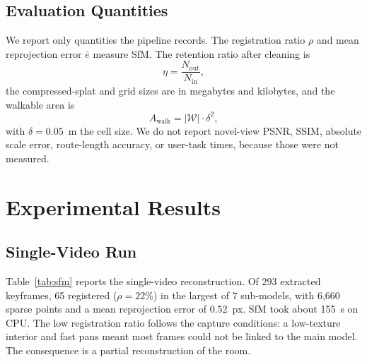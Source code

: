 \documentclass[conference]{IEEEtran}
\begin{document}
\subsection{Evaluation Quantities}
We report only quantities the pipeline records. The registration ratio $\rho$ and mean reprojection error $\bar{e}$ measure SfM. The retention ratio after cleaning is
\begin{equation}
\eta = \frac{N_{\mathrm{out}}}{N_{\mathrm{in}}},
\end{equation}
the compressed-splat and grid sizes are in megabytes and kilobytes, and the walkable area is
\begin{equation}
A_{\mathrm{walk}} = |\mathcal{W}| \cdot \delta^{2},
\end{equation}
with $\delta = 0.05$~m the cell size. We do not report novel-view PSNR, SSIM, absolute scale error, route-length accuracy, or user-task times, because those were not measured.

\section{Experimental Results}
\label{sec:results}
\subsection{Single-Video Run}
Table~\ref{tab:sfm} reports the single-video reconstruction. Of 293 extracted keyframes, 65 registered ($\rho = 22\%$) in the largest of 7 sub-models, with 6,660 sparse points and a mean reprojection error of 0.52~px. SfM took about 155~s on CPU. The low registration ratio follows the capture conditions: a low-texture interior and fast pans meant most frames could not be linked to the main model. The consequence is a partial reconstruction of the room.
\end{document}
